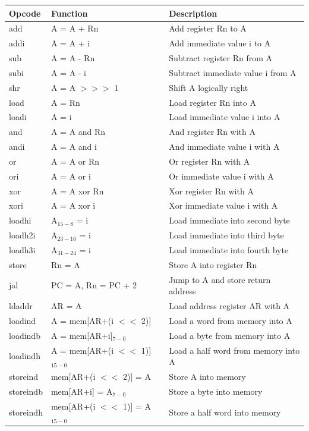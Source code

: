 \documentclass[%
    10pt,
    headinclude, footinclude=false,
    openright, %
    notitlepage,
    cleardoublepage=empty,
    headsepline,
    numbers=noenddot,
    bibliography=totoc, index=totoc,
    ]{scrbook}
\begin{document}
\begin{table}
\centering
\begin{tabular}{lll}
\toprule
Opcode & Function & Description\\
\midrule
add & A = A + Rn & Add register Rn to A \\
addi & A = A + i & Add immediate value i to A \\
sub & A = A - Rn & Subtract register Rn from A \\
subi & A = A - i & Subtract immediate value i from A \\
shr & A = A $>>>$ 1 & Shift A logically right \\
load & A = Rn & Load register Rn into A \\
loadi & A = i & Load immediate value i into A \\
and & A = A and Rn & And register Rn with A \\
andi & A = A and i & And immediate value i with A \\
or & A = A or Rn & Or register Rn with A \\
ori & A = A or i & Or immediate value i with A \\
xor & A = A xor Rn & Xor register Rn with A \\
xori & A = A xor i & Xor immediate value i with A \\
loadhi & A$_{15-8}$ = i & Load immediate into second byte \\
loadh2i & A$_{23-16}$ = i  & Load immediate into third byte \\
loadh3i & A$_{31-24}$ = i & Load immediate into fourth byte \\
store & Rn = A & Store A into register Rn \\
jal & PC = A, Rn = PC + 2 & Jump to A and store return address\\%
ldaddr & AR = A & Load address register AR with A \\
loadind & A = mem[AR+(i $<<$ 2)] & Load a word from memory into A \\
loadindb & A = mem[AR+i]$_{7-0}$  &  Load a byte from memory into A\\
loadindh & A = mem[AR+(i $<<$ 1)]$_{15-0}$  &  Load a half word from memory into A\\
storeind & mem[AR+(i $<<$ 2)] = A & Store A into memory \\
storeindb & mem[AR+i] = A$_{7-0}$ & Store a byte into memory \\
storeindh & mem[AR+(i $<<$ 1)] = A$_{15-0}$ & Store a half word into memory \\

\end{tabular}
\end{table}
\end{document}
